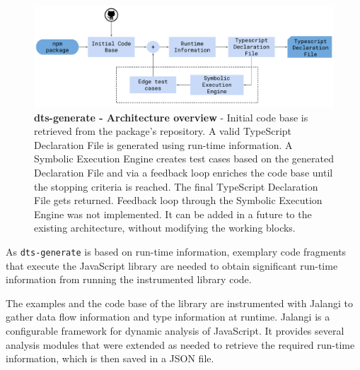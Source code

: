 \documentclass[a4paper,english,cleveref, autoref]{lipics-v2019}
\newcommand{\figref}[1]{Figure~\ref{#1}}
\begin{document}

\begin{figure}[tp]
    \centering
    \includegraphics[width=1\linewidth]{dts-generate-block-diagram.pdf}
    \caption[dts-generate - Architecture overview]{\textbf{dts-generate - Architecture overview} - Initial code base is retrieved from the \NPM{} package's repository. A valid TypeScript Declaration File is generated using run-time information. A Symbolic Execution Engine creates test cases based on the generated Declaration File and via a feedback loop enriches the code base until the stopping criteria is reached. The final TypeScript Declaration File gets returned. Feedback loop through the Symbolic Execution Engine was not implemented. It can be added in a future to the existing architecture, without modifying the working blocks.}
    \label{fig:tsd_generation_method_block_diagram}
  \end{figure}

As \texttt{dts-generate} is based on run-time information, 
exemplary code fragments that execute the JavaScript library are
needed to obtain 
significant run-time information from running the instrumented library
code.


The examples and the code base of the library are instrumented with
Jalangi \cite{DBLP:conf/sigsoft/SenKBG13} to gather data flow
information and type information at runtime. Jalangi is a configurable
framework for dynamic analysis of JavaScript. It provides several
analysis modules that were extended as needed to retrieve the required
run-time information, which is then saved in a JSON file. 
\end{document}
